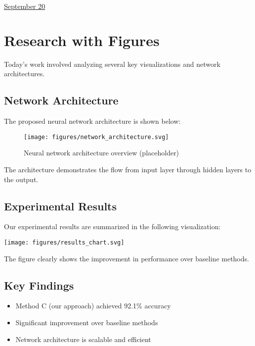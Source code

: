 \documentclass[11pt,letterpaper]{article}
\begin{document}
\href{run:2025-09-20-figures-test.tex}{\Huge September 20} %

\section{Research with Figures}

Today's work involved analyzing several key visualizations and network architectures.

\subsection{Network Architecture}
The proposed neural network architecture is shown below:

\begin{figure}[h]
\centering
\texttt{[image: figures/network\_architecture.svg]}
\caption{Neural network architecture overview (placeholder)}
\label{fig:network}
\end{figure}

The architecture demonstrates the flow from input layer through hidden layers to the output.

\subsection{Experimental Results}
Our experimental results are summarized in the following visualization:

\texttt{[image: figures/results\_chart.svg]}

The figure clearly shows the improvement in performance over baseline methods.

\subsection{Key Findings}
\begin{itemize}
\item Method C (our approach) achieved 92.1\% accuracy
\item Significant improvement over baseline methods
\item Network architecture is scalable and efficient
\end{itemize}

 
\end{document}
